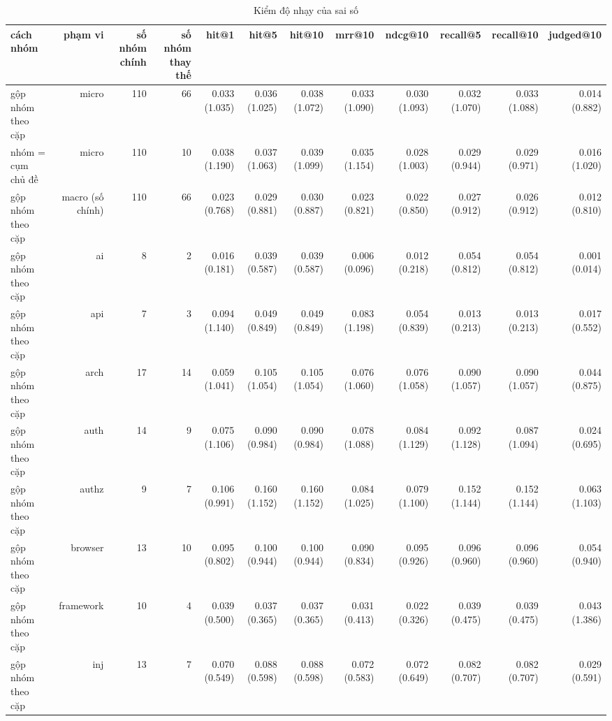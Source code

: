 \begin{table}[ht]
\centering
\caption{Kiểm độ nhạy của sai số}
\begin{tabular}{lrrrrrrrrrrr}
\toprule
cách nhóm & phạm vi & số nhóm chính & số nhóm thay thế & hit@1 & hit@5 & hit@10 & mrr@10 & ndcg@10 & recall@5 & recall@10 & judged@10 \\
\midrule
gộp nhóm theo cặp & micro & 110 & 66 & 0.033 (1.035) & 0.036 (1.025) & 0.038 (1.072) & 0.033 (1.090) & 0.030 (1.093) & 0.032 (1.070) & 0.033 (1.088) & 0.014 (0.882) \\
nhóm = cụm chủ đề & micro & 110 & 10 & 0.038 (1.190) & 0.037 (1.063) & 0.039 (1.099) & 0.035 (1.154) & 0.028 (1.003) & 0.029 (0.944) & 0.029 (0.971) & 0.016 (1.020) \\
gộp nhóm theo cặp & macro (số chính) & 110 & 66 & 0.023 (0.768) & 0.029 (0.881) & 0.030 (0.887) & 0.023 (0.821) & 0.022 (0.850) & 0.027 (0.912) & 0.026 (0.912) & 0.012 (0.810) \\
gộp nhóm theo cặp & ai & 8 & 2 & 0.016 (0.181) & 0.039 (0.587) & 0.039 (0.587) & 0.006 (0.096) & 0.012 (0.218) & 0.054 (0.812) & 0.054 (0.812) & 0.001 (0.014) \\
gộp nhóm theo cặp & api & 7 & 3 & 0.094 (1.140) & 0.049 (0.849) & 0.049 (0.849) & 0.083 (1.198) & 0.054 (0.839) & 0.013 (0.213) & 0.013 (0.213) & 0.017 (0.552) \\
gộp nhóm theo cặp & arch & 17 & 14 & 0.059 (1.041) & 0.105 (1.054) & 0.105 (1.054) & 0.076 (1.060) & 0.076 (1.058) & 0.090 (1.057) & 0.090 (1.057) & 0.044 (0.875) \\
gộp nhóm theo cặp & auth & 14 & 9 & 0.075 (1.106) & 0.090 (0.984) & 0.090 (0.984) & 0.078 (1.088) & 0.084 (1.129) & 0.092 (1.128) & 0.087 (1.094) & 0.024 (0.695) \\
gộp nhóm theo cặp & authz & 9 & 7 & 0.106 (0.991) & 0.160 (1.152) & 0.160 (1.152) & 0.084 (1.025) & 0.079 (1.100) & 0.152 (1.144) & 0.152 (1.144) & 0.063 (1.103) \\
gộp nhóm theo cặp & browser & 13 & 10 & 0.095 (0.802) & 0.100 (0.944) & 0.100 (0.944) & 0.090 (0.834) & 0.095 (0.926) & 0.096 (0.960) & 0.096 (0.960) & 0.054 (0.940) \\
gộp nhóm theo cặp & framework & 10 & 4 & 0.039 (0.500) & 0.037 (0.365) & 0.037 (0.365) & 0.031 (0.413) & 0.022 (0.326) & 0.039 (0.475) & 0.039 (0.475) & 0.043 (1.386) \\
gộp nhóm theo cặp & inj & 13 & 7 & 0.070 (0.549) & 0.088 (0.598) & 0.088 (0.598) & 0.072 (0.583) & 0.072 (0.649) & 0.082 (0.707) & 0.082 (0.707) & 0.029 (0.591) \\

\end{tabular}
\end{table}
